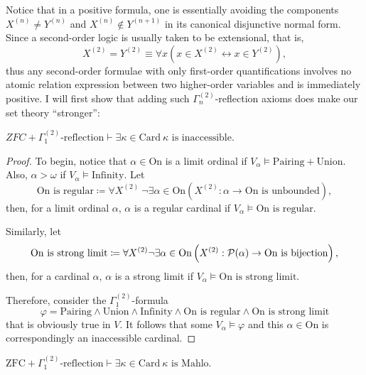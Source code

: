 \documentclass[12pt]{article}
\theoremstyle{plain}
\theoremstyle{definition}
\newcommand{\ZFC}{\mathrm{ZFC}}
\newcommand{\On}{\mathrm{On}}
\newcommand{\Card}{\mathrm{Card}}
\begin{document}
Notice that in a positive formula, one is essentially avoiding the components $X^{(n)} \neq Y^{(n)}$ and $X^{(n)} \not\in Y^{(n + 1)}$ in its canonical disjunctive normal form. Since a second-order logic is usually taken to be extensional, that is,
\[X^{(2)} = Y^{(2)} \equiv \forall x \left(x \in X^{(2)} \leftrightarrow x \in Y^{(2)}\right),\]
thus any second-order formulae with only first-order quantifications involves no atomic relation expression between two higher-order variables and is immediately positive. I will first show that adding such $\Gamma^{(2)}_n$-reflection axioms does make our set theory ``stronger'':

\begin{proposition}
	$ZFC + \text{$\Gamma^{(2)}_1$-reflection} \vdash \exists \kappa \in \Card \ \text{$\kappa$ is inaccessible}$.
\end{proposition}

\begin{proof}
	To begin, notice that $\alpha \in \On$ is a limit ordinal if $V_\alpha \vDash \text{Pairing} + \text{Union}$. Also, $\alpha > \omega$ if $V_\alpha \vDash \text{Infinity}$. Let
	\[\text{$\On$ is regular} \coloneqq \forall X^{(2)} \ \neg \exists \alpha \in \On \left(\text{$X^{(2)} : \alpha \rightarrow \On$ is unbounded}\right),\]
	then, for a limit ordinal $\alpha$, $\alpha$ is a regular cardinal if $V_\alpha \vDash \text{$\On$ is regular}$.

	Similarly, let
	\[\text{$\On$ is strong limit} \coloneqq \forall X^{(2)} \neg \exists \alpha \in \On \left(\text{$X^{(2)} : \mathcal{P}\mleft(\alpha\mright) \rightarrow \On$ is bijection}\right),\]
	then, for a cardinal $\alpha$, $\alpha$ is a strong limit if $V_\alpha \vDash \text{$\On$ is strong limit}$.

	Therefore, consider the $\Gamma^{(2)}_1$-formula
	\[\varphi = \text{Pairing} \land \text{Union} \land \text{Infinity} \land \text{$\On$ is regular} \land \text{$\On$ is strong limit}\]
	that is obviously true in $V$. It follows that some $V_\alpha \vDash \varphi$ and this $\alpha \in \On$ is correspondingly an inaccessible cardinal.
\end{proof}

\begin{proposition}
	$\ZFC + \text{$\Gamma^{(2)}_1$-reflection} \vdash \exists \kappa \in \Card \ \text{$\kappa$ is Mahlo}$.
\end{proposition}
\end{document}
